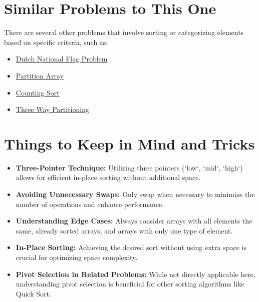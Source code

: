 \section*{Similar Problems to This One}
There are several other problems that involve sorting or categorizing elements based on specific criteria, such as:
\begin{itemize}
    \item \hyperref[problem:dutch_national_flag]{Dutch National Flag Problem}
    \item \hyperref[problem:partition_array]{Partition Array}
    \item \hyperref[problem:counting_sort]{Counting Sort}
    \item \hyperref[problem:three_way_partitioning]{Three Way Partitioning}
\end{itemize}

\section*{Things to Keep in Mind and Tricks}
\begin{itemize}
    \item \textbf{Three-Pointer Technique:} Utilizing three pointers (`low`, `mid`, `high`) allows for efficient in-place sorting without additional space.
    
    \item \textbf{Avoiding Unnecessary Swaps:} Only swap when necessary to minimize the number of operations and enhance performance.
    
    \item \textbf{Understanding Edge Cases:} Always consider arrays with all elements the same, already sorted arrays, and arrays with only one type of element.
    
    \item \textbf{In-Place Sorting:} Achieving the desired sort without using extra space is crucial for optimizing space complexity.
    
    \item \textbf{Pivot Selection in Related Problems:} While not directly applicable here, understanding pivot selection is beneficial for other sorting algorithms like Quick Sort.
\end{itemize}

